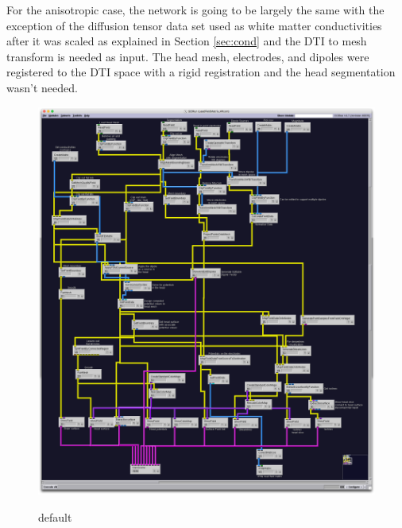 For the anisotropic case, the network is going to be largely the same with the exception of the diffusion tensor data set used as white matter conductivities after it was scaled as explained in Section \ref{sec:cond} and the DTI to mesh transform is needed as input. The head mesh, electrodes, and dipoles were registered to the DTI space with a rigid registration and the head segmentation wasn't needed.

\begin{figure}[p]
\begin{center}
\includegraphics[width=\textwidth]{Figures/iso_network.png}\\
\caption{default}
\label{default}
\end{center}
\end{figure}

